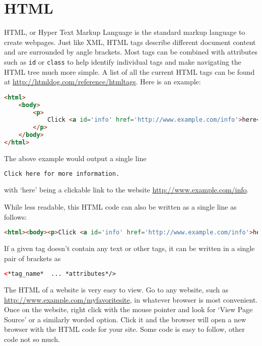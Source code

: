 \label{lab:BS_scraping}

\section*{HTML}
HTML, or Hyper Text Markup Language is the standard markup language to create webpages.
Just like XML, HTML tags describe different document content and are surrounded by angle brackets.
Most tags can be combined with attributes such as \lstinline[language=html]{id} or \lstinline[language=html]{class} to help identify individual tags and make navigating the HTML tree much more simple.
A list of all the current HTML tags can be found at \url{http://htmldog.com/reference/htmltags}.
Here is an example:
\begin{lstlisting}[language=HTML]
<html>
    <body>
        <p>
            Click <a id='info' href='http://www.example.com/info'>here</a> for more information.
        </p>
    </body>
</html>
\end{lstlisting}

The above example would output a single line
\begin{lstlisting}[language=HTML]
Click here for more information.
\end{lstlisting}
with `here' being a clickable link to the website \url{http://www.example.com/info}.

While less readable, this HTML code can also be written as a single line as follows:
\begin{lstlisting}[language=HTML]
<html><body><p>Click <a id='info' href='http://www.example.com/info'>here</a> for more information.</p></body></html>
\end{lstlisting}
If a given tag doesn't contain any text or other tags, it can be written in a single pair of brackets as
\begin{lstlisting}[language=HTML]
<*tag_name*  ... *attributes*/>
\end{lstlisting}

The HTML of a website is very easy to view.
Go to any website, such as \url{http://www.example.com/myfavoritesite}, in whatever browser is most convenient.
Once on the website, right click with the mouse pointer and look for `View Page Source' or a similarly worded option.
Click it and the browser will open a new browser with the HTML code for your site.
Some code is easy to follow, other code not so much.


